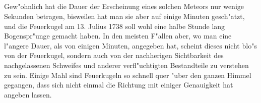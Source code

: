 \documentclass[a4paper, 11pt, oneside, polutonikogreek, german]{article}
\begin{document}
\subsection{}
\paragraph{}
Gew"ohnlich hat die Dauer der Erscheinung eines solchen Meteors nur wenige Sekunden betragen, bisweilen hat man sie aber auf einige Minuten gesch"atzt, und die Feuerkugel am 13. Julius 1738 soll wohl eine halbe Stunde lang Bogenspr"unge gemacht haben. In den meisten F"allen aber, wo man eine l"angere Dauer, als von einigen Minuten, angegeben hat, scheint dieses nicht blo"s von der Feuerkugel, sondern auch von der nachherigen Sichtbarkeit des nachgelassenen Schweifes und anderer verfl"uchtigten Bestandteile zu verstehen zu sein. Einige Mahl sind Feuerkugeln so schnell quer "uber den ganzen Himmel gegangen, dass sich nicht einmal die Richtung mit einiger Genauigkeit hat angeben lassen.
\subsection{}
\end{document}
